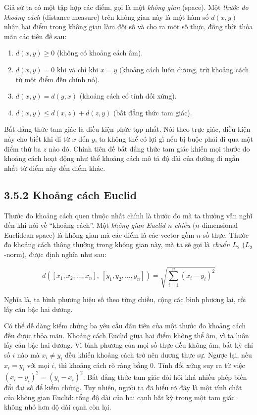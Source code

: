Giả sử ta có một tập hợp các điểm, gọi là một \emph{không gian} (space). Một \emph{thước đo khoảng cách} (distance measure) trên không gian này là một hàm số $d(x,y)$ nhận hai điểm trong không gian làm đối số và cho ra một số thực, đồng thời thỏa mãn các tiên đề sau:

\begin{enumerate}
  \item $d(x,y) \geq 0$ (không có khoảng cách âm).
  \item $d(x,y) = 0$ khi và chỉ khi $x = y$ (khoảng cách luôn dương, trừ khoảng cách từ một điểm đến chính nó).
  \item $d(x,y) = d(y,x)$ (khoảng cách có tính đối xứng).
  \item $d(x,y) \leq d(x,z) + d(z,y)$ (bất đẳng thức tam giác).
\end{enumerate}

Bất đẳng thức tam giác là điều kiện phức tạp nhất. Nói theo trực giác, điều kiện này cho biết khi đi từ $x$ đến $y$, ta không thể có lợi gì nếu bị buộc phải đi qua một điểm thứ ba $z$ nào đó. Chính tiên đề bất đẳng thức tam giác khiến mọi thước đo khoảng cách hoạt động như thể khoảng cách mô tả độ dài của đường đi ngắn nhất từ điểm này đến điểm khác.

\subsection*{3.5.2 Khoảng cách Euclid}

Thước đo khoảng cách quen thuộc nhất chính là thước đo mà ta thường vẫn nghĩ đến khi nói về ``khoảng cách''. Một \emph{không gian Euclid $n$ chiều} ($n$-dimensional Euclidean space) là không gian mà các điểm là các vector gồm $n$ số thực. Thước đo khoảng cách thông thường trong không gian này, mà ta sẽ gọi là \emph{chuẩn $L_2$} ($L_2$-norm), được định nghĩa như sau:

$$d([x_1,x_2,\ldots,x_n],\ [y_1,y_2,\ldots,y_n]) = \sqrt{\sum_{i=1}^{n}(x_i-y_i)^2}$$

Nghĩa là, ta bình phương hiệu số theo từng chiều, cộng các bình phương lại, rồi lấy căn bậc hai dương.

Có thể dễ dàng kiểm chứng ba yêu cầu đầu tiên của một thước đo khoảng cách đều được thỏa mãn. Khoảng cách Euclid giữa hai điểm không thể âm, vì ta luôn lấy căn bậc hai dương. Vì bình phương của mọi số thực đều không âm, bất kỳ chỉ số $i$ nào mà $x_i \neq y_i$ đều khiến khoảng cách trở nên dương thực sự. Ngược lại, nếu $x_i = y_i$ với mọi $i$, thì khoảng cách rõ ràng bằng 0. Tính đối xứng suy ra từ việc $(x_i-y_i)^2 = (y_i-x_i)^2$. Bất đẳng thức tam giác đòi hỏi khá nhiều phép biến đổi đại số để kiểm chứng. Tuy nhiên, người ta đã hiểu rõ đây là một tính chất của không gian Euclid: tổng độ dài của hai cạnh bất kỳ trong một tam giác không nhỏ hơn độ dài cạnh còn lại.

